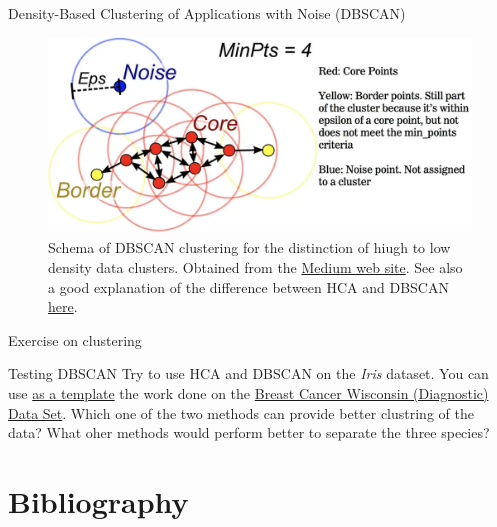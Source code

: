 \documentclass{beamer}
\begin{document}
\begin{frame}{Density-Based Clustering of Applications with Noise (DBSCAN)}
    \begin{figure}
        \includegraphics[width=\linewidth]{DBSCAN}
        \caption{Schema of DBSCAN clustering for the distinction of hiugh to low density data clusters. Obtained from the \href{https://elutins.medium.com/dbscan-what-is-it-when-to-use-it-how-to-use-it-8bd506293818}{Medium web site}. See also a good explanation of the difference between HCA and DBSCAN \href{https://ryanwingate.com/intro-to-machine-learning/unsupervised/hierarchical-and-density-based-clustering/}{here}.}
    \end{figure}
\end{frame}


\begin{frame}{Exercise on clustering}
    \begin{Exercise}{Testing DBSCAN}
        Try to use HCA and DBSCAN on the {\em Iris} dataset. You can use \href{https://www.kaggle.com/code/raphaelekete/cluster-analysis-of-breast-cancer-data-set/notebook}{as a template} the work done on the \href{https://archive.ics.uci.edu/dataset/17/breast+cancer+wisconsin+diagnostic}{Breast Cancer Wisconsin (Diagnostic) Data Set}. 
        Which one of the two methods can provide better clustring of the data? What oher methods would perform better to separate the three species?
    \end{Exercise}
\end{frame}


\section{Bibliography}


\end{document}

